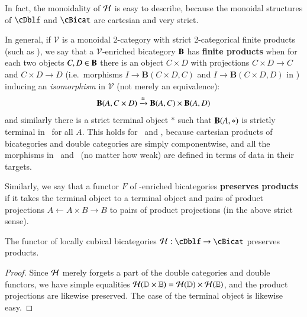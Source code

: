 In fact, the monoidality of $\mathcal{H}$ is easy to describe, because the monoidal structures of $\cDblf$ and $\cBicat$ are cartesian and very strict.

In general, if $\mathcal{V}$ is a monoidal 2-category with strict 2-categorical finite products (such as \cDbl), we say that a $\mathcal{V}$-enriched bicategory ${\bf B}$ has \textbf{finite products} when for each two objects $C,D \in {\bf B}$ there is an object $C\times D$ with projections $C\times D\to C$ and $C\times D\to D$ (i.e.\ morphisms $I\to \mathbf{B}(C\times D,C)$ and $I\to \mathbf{B}(C\times D,D)$ in \cV) inducing an \emph{isomorphism} in $\mathcal{V}$ (not merely an equivalence):
%
\begin{align}
{\bf B}(A, C \times D) \xrightarrow{\cong} {\bf B}(A,C) \times {\bf B}(A,D)
\end{align}
and similarly there is a strict terminal object $\ast$ such that $\mathbf{B}(A,\ast)$ is strictly terminal in \cV\ for all $A$.
This holds for \cBicat\ and \cDblf, because cartesian products of bicategories and double categories are simply componentwise, and all the morphisms in \cBicat\ and \cDblf\ (no matter how weak) are defined in terms of data in their targets.

Similarly, we say that a functor $F$ of \cV-enriched bicategories \textbf{preserves products} if it takes the terminal object to a terminal object and pairs of product projections $A \leftarrow A\times B \to B$ to pairs of product projections (in the above strict sense).

\begin{thm}
The functor of locally cubical bicategories $\cH: \cDblf \rightarrow \cBicat$ preserves products.
\end{thm}
\begin{proof}
Since $\mathcal{H}$ merely forgets a part of the double categories and double functors, we have simple equalities
$\mathcal{H}(\mathbb{D} \times \mathbb{E}) = \mathcal{H}(\mathbb{D}) \times \mathcal{H}(\mathbb{E})$, and the product projections are likewise preserved.
The case of the terminal object is likewise easy.
\end{proof}

